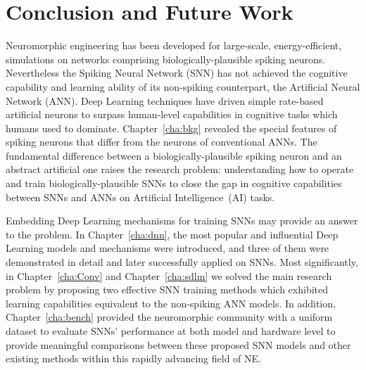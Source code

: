 \chapter{Conclusion and Future Work}
\label{cha:conc}
Neuromorphic engineering has been developed for large-scale, energy-efficient, simulations on networks comprising biologically-plausible spiking neurons.
Nevertheless the Spiking Neural Network (SNN) has not achieved the cognitive capability and learning ability of its non-spiking counterpart, the Artificial Neural Network (ANN).
Deep Learning techniques have driven simple rate-based artificial neurons to surpass human-level capabilities in cognitive tasks which humans used to dominate. 
Chapter~\ref{cha:bkg} revealed the special features of spiking neurons that differ from the neurons of conventional ANNs.
The fundamental difference between a biologically-plausible spiking neuron and an abstract artificial one raises the research problem: understanding how to operate and train biologically-plausible SNNs to close the gap in cognitive capabilities between SNNs and ANNs on Artificial Intelligence~(AI) tasks.

Embedding Deep Learning mechanisms for training SNNs may provide an answer to the problem.
In Chapter~\ref{cha:dnn}, the most popular and influential Deep Learning models and mechanisms were introduced, and three of them were demonstrated in detail and later successfully applied on SNNs.
Most significantly, in Chapter~\ref{cha:Conv} and Chapter~\ref{cha:sdlm} we solved the main research problem by proposing two effective SNN training methods which exhibited learning capabilities equivalent to the non-spiking ANN models. 
In addition, Chapter~\ref{cha:bench} provided the neuromorphic community with a uniform dataset to evaluate SNNs' performance at both model and hardware level to provide meaningful comparisons between these proposed SNN models and other existing methods within this rapidly advancing field of NE.%

